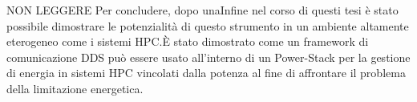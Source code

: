 NON LEGGERE
Per concludere, dopo unaInfine nel corso di questi tesi è stato possibile dimostrare le potenzialità di questo strumento in un ambiente altamente eterogeneo  come i sistemi HPC.È stato dimostrato come un framework di comunicazione DDS può essere usato all'interno di un Power-Stack per la gestione di energia in sistemi HPC vincolati dalla potenza al fine di affrontare il problema della limitazione energetica. %

